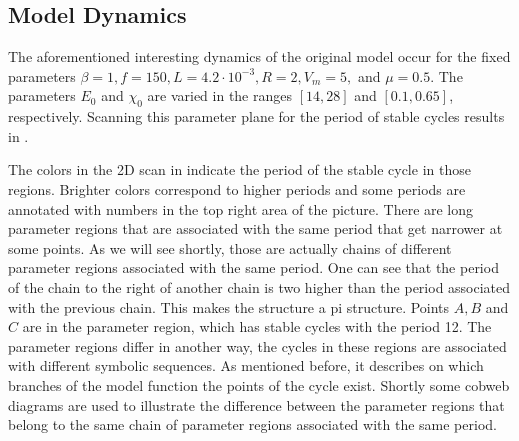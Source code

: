 \subsection{Model Dynamics}
\label{sec:state.og.dynamics}

The aforementioned interesting dynamics of the original model occur for the fixed parameters $\beta = 1, f = 150, L = 4.2 \cdot 10^{-3}, R = 2, V_m = 5,$ and $\mu = 0.5$.
The parameters $E_0$ and $\chi_0$ are varied in the ranges $[14, 28]$ and $[0.1, 0.65]$, respectively.
Scanning this parameter plane for the period of stable cycles results in .

The colors in the 2D scan in  indicate the period of the stable cycle in those regions.
Brighter colors correspond to higher periods and some periods are annotated with numbers in the top right area of the picture.
There are long parameter regions that are associated with the same period that get narrower at some points.
As we will see shortly, those are actually chains of different parameter regions associated with the same period.
One can see that the period of the chain to the right of another chain is two higher than the period associated with the previous chain.
This makes the structure a \gls{pi} structure.
Points $A, B$ and $C$ are in the parameter region, which has stable cycles with the period 12.
The parameter regions differ in another way, the cycles in these regions are associated with different symbolic sequences.
As mentioned before, it describes on which branches of the model function the points of the cycle exist.
Shortly some cobweb diagrams are used to illustrate the difference between the parameter regions that belong to the same chain of parameter regions associated with the same period.

\clearpage

